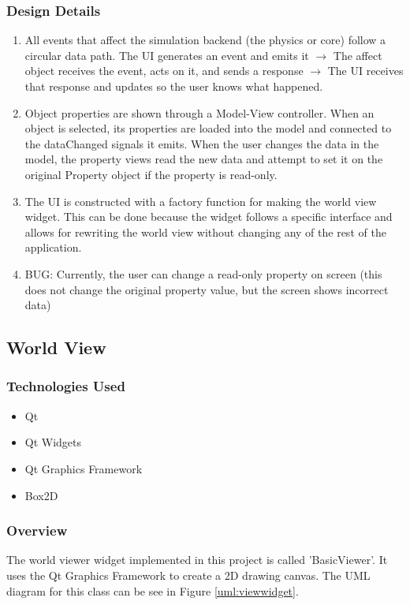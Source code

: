  \subsubsection*{Design Details}
 \begin{enumerate}
 	\item All events that affect the simulation backend (the physics or core) follow a circular data path. The UI generates an event and emits it $\rightarrow$ The affect object receives the event, acts on it, and sends a response $\rightarrow$ The UI receives that response and updates so the user knows what happened.
 	\item Object properties are shown through a Model-View controller. When an object is selected, its properties are loaded into the model and connected to the dataChanged signals it emits. When the user changes the data in the model, the property views read the new data and attempt to set it on the original Property object if the property is read-only.
 	\item The UI is constructed with a factory function for making the world view widget. This can be done because the widget follows a specific interface and allows for rewriting the world view without changing any of the rest of the application.
 	\item BUG: Currently, the user can change a read-only property on screen (this does not change the original property value, but the screen shows incorrect data)
 \end{enumerate}
\subsection{World View}
\subsubsection*{Technologies Used}
\begin{itemize}
	\item Qt
	\item Qt Widgets
	\item Qt Graphics Framework
	\item Box2D
\end{itemize}
\subsubsection*{Overview}
The world viewer widget implemented in this project is called 'BasicViewer'. It uses the Qt Graphics Framework to create a 2D drawing canvas. The UML diagram for this class can be see in Figure \ref{uml:viewwidget}.


